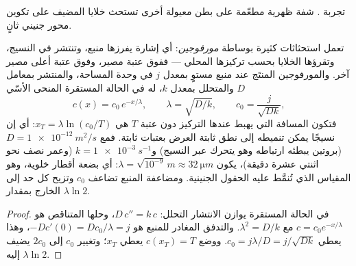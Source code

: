 \begin{omfigure}

{\small تجربة . شفة ظهرية مطعّمة على بطن
معيولة أخرى تستحث خلايا المضيف على تكوين محور
جنيني ثانٍ.}
\end{omfigure}

\begin{theorem}\label{thm:b2:vertebrate-development:gradient}
تعمل استحثاثات كثيرة بوساطة \emph{مورفوجين}: أي إشارة يفرزها
منبع، وتنتشر في النسيج، وتقرؤها الخلايا بحسب
تركيزها المحلي --- ففوق عتبة مصير، وفوق عتبة
أعلى مصير آخر. والمورفوجين المنتَج عند منبع مستوٍ بمعدل
$j$ في وحدة المساحة، والمنتشر بمعامل $D$ والمتحلل
بمعدل $k$، له في الحالة المستقرة المنحى الأسّي
\[
c(x) = c_0\,e^{-x/\lambda}, \qquad \lambda = \sqrt{D/k}, \qquad c_0 = \frac{j}{\sqrt{Dk}},
\]
فتكون المسافة التي يهبط عندها التركيز دون
عتبة $T$ هي $x_T = \lambda\ln(c_0/T)$: أي إن نسيجًا يمكن
تنميطه إلى نطق ثابتة العرض بعتبات ثابتة. فمع $D =
\qty{1e-12}{m^2/s}$ (بروتين يبطئه ارتباطه وهو يتحرك عبر
النسيج) و$k = \qty{1e-3}{s^{-1}}$ (وعمر نصف نحو اثنتي عشرة
دقيقة)، يكون $\lambda = \sqrt{10^{-9}}\,\unit{m} \approx
\qty{32}{\micro m}$: أي بضعة أقطار خلوية،
وهو المقياس الذي تُنمَّط عليه الحقول الجنينية. ومضاعفة
المنبع تضاعف $c_0$ وتزيح كل حد إلى الخارج بمقدار $\lambda
\ln 2$.
\end{theorem}
\begin{proof}
في الحالة المستقرة يوازن الانتشار التحلل: $D\,c'' = k\,c$،
وحلها المتناقص هو $c = c_0 e^{-x/\lambda}$ مع $\lambda^2 =
D/k$. والتدفق المغادر للمنبع هو $-Dc'(0) = Dc_0/\lambda = j$،
وهذا يعطي $c_0 = j\lambda/D = j/\sqrt{Dk}$. ووضع $c(x_T) = T$
يعطي $x_T$؛ وتغيير $c_0$ إلى $2c_0$ يضيف إليه $\lambda\ln 2$.
\end{proof}

